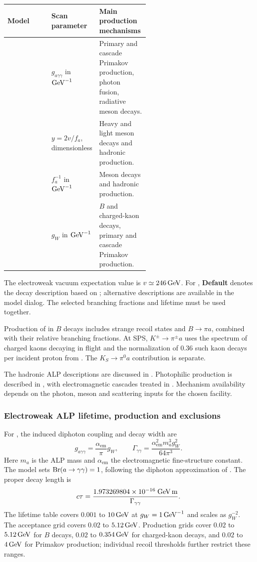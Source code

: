 \begin{tabularx}{\linewidth}{@{}P{0.31\linewidth}P{0.26\linewidth}Y@{}}
\toprule
Model & Scan parameter & Main production mechanisms \\
\midrule
{} & $g_{a\gamma\gamma}$ in $\mathrm{GeV}^{-1}$ & Primary and cascade Primakov production, photon fusion, radiative meson decays. \\
 & $y=2v/f_a$, dimensionless & Heavy and light meson decays and hadronic production. \\
 & $f_a^{-1}$ in $\mathrm{GeV}^{-1}$ & Meson decays and hadronic production. \\
 & $g_W$ in $\mathrm{GeV}^{-1}$ & $B$ and charged-kaon decays, primary and cascade Primakov production. \\
\bottomrule
\end{tabularx}

The electroweak vacuum expectation value is $v\simeq246\,\mathrm{GeV}$. For , \textbf{Default} denotes the decay description based on ; alternative descriptions are available in the model dialog. The selected branching fractions and lifetime must be used together.

Production of  in $B$ decays includes strange recoil states and $B\to\pi a$, combined with their relative branching fractions. At SPS, $K^\pm\to\pi^\pm a$ uses the spectrum of charged kaons decaying in flight and the normalization of 0.36 such kaon decays per incident proton from . The $K_S\to\pi^0a$ contribution is separate.

The hadronic ALP descriptions are discussed in . Photophilic production is described in , with electromagnetic cascades treated in . Mechanism availability depends on the photon, meson and scattering inputs for the chosen facility.

\subsubsection{Electroweak ALP lifetime, production and exclusions}
For , the induced diphoton coupling and decay width are
\begin{equation}
 g_{a\gamma\gamma}=\frac{\alpha_{\mathrm{em}}}{\pi}g_W,
 \qquad
 \Gamma_{\gamma\gamma}=\frac{\alpha_{\mathrm{em}}^2m_a^3g_W^2}{64\pi^3}.
\end{equation}
Here $m_a$ is the ALP mass and $\alpha_{\mathrm{em}}$ the electromagnetic fine-structure constant. The model sets $\operatorname{Br}(a\to\gamma\gamma)=1$, following the diphoton approximation of . The proper decay length is
\begin{equation}
 c\tau=\frac{1.973269804\times10^{-16}\;\mathrm{GeV}\,\mathrm{m}}{\Gamma_{\gamma\gamma}}.
\end{equation}
The lifetime table covers $0.001$ to $10\,\mathrm{GeV}$ at $g_W=1\,\mathrm{GeV}^{-1}$ and scales as $g_W^{-2}$. The acceptance grid covers $0.02$ to $5.12\,\mathrm{GeV}$. Production grids cover $0.02$ to $5.12\,\mathrm{GeV}$ for $B$ decays, $0.02$ to $0.354\,\mathrm{GeV}$ for charged-kaon decays, and $0.02$ to $4\,\mathrm{GeV}$ for Primakov production; individual recoil thresholds further restrict these ranges.

